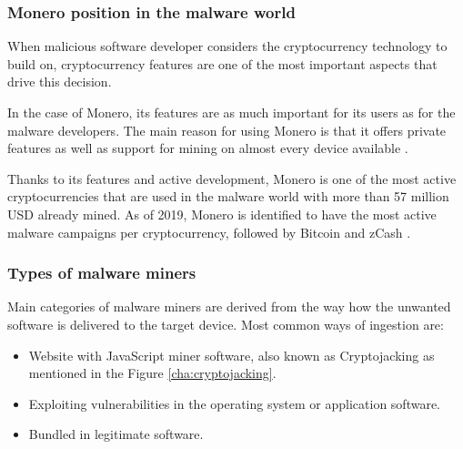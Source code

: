 \documentclass[
  printed, %
  table,   %
  lof,     %
  lot,     %
           oneside, color
]{fithesis3}
\begin{document}
\subsubsection{Monero position in the malware world}
When malicious software developer considers the cryptocurrency technology to build on, cryptocurrency features are one of the most important aspects that drive this decision.

In the case of Monero, its features are as much important for its users as for the malware developers. The main reason for using Monero is that it offers private features as well as support for mining on almost every device available \cite{eskandari2018first}.

Thanks to its features and active development, Monero is one of the most active cryptocurrencies that are used in the malware world with more than 57 million USD already mined. As of 2019, Monero is identified to have the most active malware campaigns per cryptocurrency, followed by Bitcoin and zCash \cite{konoth2019malicious}.
\vspace{-0.6em}
\subsubsection{Types of malware miners}
Main categories of malware miners are derived from the way how the unwanted software is delivered to the target device. Most common ways of ingestion are:
\begin{itemize}
\itemsep0em
\item Website with JavaScript miner software, also known as Cryptojacking as mentioned in the Figure \ref{cha:cryptojacking}. 
\item Exploiting vulnerabilities in the operating system or application software.
\item Bundled in legitimate software.
\end{itemize}


\end{document}
